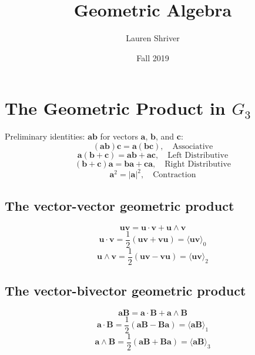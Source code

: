 \documentclass[a4paper]{article}
\title{Geometric Algebra}
\author{Lauren Shriver}
\date{Fall 2019}
\begin{document}
\maketitle

\section*{The Geometric Product in $G_3$}
Preliminary identities: $\mathbf{ab}$ for vectors $\mathbf{a}$, $\mathbf{b}$, and $\mathbf{c}$:
    \begin{equation}
        (\mathbf{ab})\mathbf{c} = \mathbf{a}(\mathbf{bc}), \quad \mathrm{Associative}
    \end{equation}
    \begin{equation}
        \mathbf{a}(\mathbf{b}+\mathbf{c}) = \mathbf{ab}+\mathbf{ac}, \quad \mathrm{Left \, \, Distributive}
    \end{equation}
    \begin{equation}
        (\mathbf{b}+\mathbf{c})\mathbf{a} = \mathbf{ba}+\mathbf{ca}, \quad \mathrm{Right \, \, Distributive}
    \end{equation}
    \begin{equation}
        \mathbf{a}^2 = |\mathbf{a}|^2, \quad \mathrm{Contraction}
    \end{equation}
\subsection*{The vector-vector geometric product}
    \begin{equation}
        \mathbf{u}\mathbf{v} = \mathbf{u}\cdot\mathbf{v} + \mathbf{u} \wedge \mathbf{v}
    \end{equation}
    \begin{equation}
        \mathbf{u} \cdot \mathbf{v} = \frac{1}{2} (\mathbf{u}\mathbf{v} + \mathbf{v}\mathbf{u}) = \langle \mathbf{u}\mathbf{v} \rangle_0
    \end{equation}
        \begin{equation}
        \mathbf{u} \wedge \mathbf{v} = \frac{1}{2} (\mathbf{u}\mathbf{v} - \mathbf{v}\mathbf{u}) = \langle \mathbf{u}\mathbf{v} \rangle_2
    \end{equation}
\subsection*{The vector-bivector geometric product}
        \begin{equation}
        \mathbf{a}\mathbf{B} = \mathbf{a}\cdot\mathbf{B} + \mathbf{a} \wedge \mathbf{B}
    \end{equation}
    \begin{equation}
        \mathbf{a} \cdot \mathbf{B} = \frac{1}{2} (\mathbf{a}\mathbf{B} - \mathbf{B}\mathbf{a}) = \langle \mathbf{a}\mathbf{B} \rangle_1
    \end{equation}
        \begin{equation}
        \mathbf{a} \wedge \mathbf{B} = \frac{1}{2} (\mathbf{a}\mathbf{B} + \mathbf{B}\mathbf{a}) = \langle \mathbf{a}\mathbf{B} \rangle_3
    \end{equation}
\end{document}
